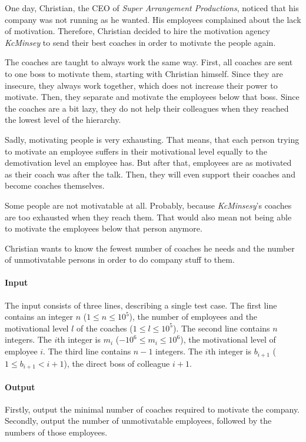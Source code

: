 



\makeheader

One day, Christian, the CEO of \textit{Super Arrangement Productions}, noticed that his company
was not running as he wanted. His employees complained about the lack of motivation.
Therefore, Christian decided to hire the motivation agency \textit{KcMinsey} to send their best
coaches in order to motivate the people again.

The coaches are taught to always work the same way. First, all coaches are sent to one boss to
motivate them, starting with Christian himself. Since they are insecure, they always work together,
which does not increase their power to motivate.
Then, they separate and motivate the employees below that boss. Since the coaches are a bit lazy,
they do not help their colleagues when they reached the lowest level of the hierarchy.

Sadly, motivating people is very exhausting. That means, that each person trying to motivate
an employee suffers in their motivational level equally to the demotivation level an employee
has. But after that, employees are as motivated as their coach was after the talk. Then,
they will even support their coaches and become coaches themselves.

Some people are not motivatable at all. Probably, because \textit{KcMinsesy}'s coaches
are too exhausted when they reach them. That would also mean not being able to motivate the
employees below that person anymore.

Christian wants to know the fewest number of coaches he needs and the number
of unmotivatable persons in order to do company stuff to them.

\paragraph*{Input}

The input consists of three lines, describing a single test case.
The first line contains an integer $n$ ($1 \leq n \leq 10^5$), the number of employees and the motivational level $l$ of the coaches ($1 \leq l \leq 10^5$).
The second line contains $n$ integers. The $i$th integer is $m_i$ ($-10^6 \leq m_i \leq 10^6$), the motivational level of employee $i$.
The third line contains $n - 1$ integers. The $i$th integer is $b_{i+1}$ ($1 \leq b_{i+1} < i + 1$), the direct boss of colleague $i + 1$.

\paragraph*{Output}

Firstly, output the minimal number of coaches required to motivate the company.
Secondly, output the number of unmotivatable employees, followed by the numbers of those employees.


\begin{samples}
\end{samples}


